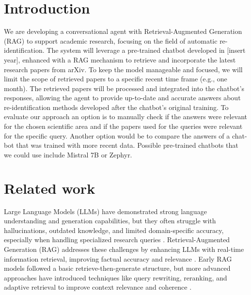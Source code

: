 \documentclass[fleqn,moreauthors,10pt]{ds_report}
\affiliation{\textit{Advisors: Aleš Žagar}}
\begin{document}
\flushbottom 

\maketitle 

\thispagestyle{empty} 


\section*{Introduction}
We are developing a conversational agent with Retrieval-Augmented 
Generation (RAG) to support academic research, focusing on the field of automatic
 re-identification. The system will leverage a pre-trained chatbot developed in
  [insert year], enhanced with a RAG mechanism to retrieve and incorporate the 
  latest research papers from arXiv. To keep the model manageable and focused, 
  we will limit the scope of retrieved papers to a specific recent time frame 
  (e.g., one month). The retrieved papers will be processed and integrated into 
  the chatbot's responses, allowing the agent to provide up-to-date and accurate 
  answers about re-identification methods developed after the chatbot’s original 
  training. To evaluate our approach an option is to manually check if the answers
   were relevant for the chosen scientific area and if the papers used for the
    queries were relevant for the specific query. Another option would be to compare
     the answers of a chat-bot that was trained with more recent data. Possible 
     pre-trained chatbots that we could use include Mistral 7B or Zephyr. 






\section*{Related work}


Large Language Models (LLMs) have demonstrated strong language understanding and generation capabilities, but they often struggle with hallucinations, outdated knowledge, and limited domain-specific accuracy, especially when handling specialized research queries \cite{kandpal2023longtail}. Retrieval-Augmented Generation (RAG) addresses these challenges by enhancing LLMs with real-time information retrieval, improving factual accuracy and relevance \cite{gao2024rag}. Early RAG models followed a basic retrieve-then-generate structure, but more advanced approaches have introduced techniques like query rewriting, reranking, and adaptive retrieval to improve context relevance and coherence \cite{gao2024rag}.
\end{document}
